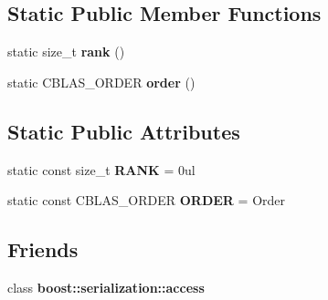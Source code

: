 \subsection*{Static Public Member Functions}
\begin{DoxyCompactItemize}
\item 
\hypertarget{classbtas_1_1_tensor_3_01_t_00_010ul_00_01_order_01_4_ab2f0ae343a010d832029980f1ff762ab}{
static size\_\-t {\bfseries rank} ()}
\label{classbtas_1_1_tensor_3_01_t_00_010ul_00_01_order_01_4_ab2f0ae343a010d832029980f1ff762ab}

\item 
\hypertarget{classbtas_1_1_tensor_3_01_t_00_010ul_00_01_order_01_4_a055b86ab82e4b0e1a14a003f7f1313ef}{
static CBLAS\_\-ORDER {\bfseries order} ()}
\label{classbtas_1_1_tensor_3_01_t_00_010ul_00_01_order_01_4_a055b86ab82e4b0e1a14a003f7f1313ef}

\end{DoxyCompactItemize}
\subsection*{Static Public Attributes}
\begin{DoxyCompactItemize}
\item 
\hypertarget{classbtas_1_1_tensor_3_01_t_00_010ul_00_01_order_01_4_ac1498e2ac74038330372a13964487824}{
static const size\_\-t {\bfseries RANK} = 0ul}
\label{classbtas_1_1_tensor_3_01_t_00_010ul_00_01_order_01_4_ac1498e2ac74038330372a13964487824}

\item 
\hypertarget{classbtas_1_1_tensor_3_01_t_00_010ul_00_01_order_01_4_a7ec48b105bb3d5552536e26d2cd40da6}{
static const CBLAS\_\-ORDER {\bfseries ORDER} = Order}
\label{classbtas_1_1_tensor_3_01_t_00_010ul_00_01_order_01_4_a7ec48b105bb3d5552536e26d2cd40da6}

\end{DoxyCompactItemize}
\subsection*{Friends}
\begin{DoxyCompactItemize}
\item 
\hypertarget{classbtas_1_1_tensor_3_01_t_00_010ul_00_01_order_01_4_ac98d07dd8f7b70e16ccb9a01abf56b9c}{
class {\bfseries boost::serialization::access}}
\label{classbtas_1_1_tensor_3_01_t_00_010ul_00_01_order_01_4_ac98d07dd8f7b70e16ccb9a01abf56b9c}

\end{DoxyCompactItemize}


